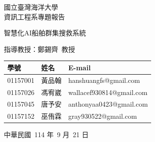 \documentclass[12pt,a4paper]{article}
\begin{document}
\begin{titlepage}

	\centering
	\vspace*{2cm}
	
	{\Large 國立臺灣海洋大學\\[0.5cm]資訊工程系專題報告 \par}
	
	\vspace*{1cm}
	{\Huge 智慧化AI船舶群集搜救系統 \par}
	
	\vfill
	
	{\Large 指導教授：鄭錫齊\ 教授 \par}
	\vspace*{1cm}
	\begin{tabular}{lll}
	學號 & 姓名 & E-mail \\
	\hline
	01157001 & 黃品翰 & hanshuangfs@gmail.com \\
	01157026 & 馮宥崴 & wallacef930814@gmail.com \\
	01157045 & 唐予安 & anthonyaa0423@gmail.com \\
	01157152 & 巫侑霖 & gray930522@gmail.com
	\end{tabular}

	\vspace*{1cm}
	{\Large 中華民國\ 114 年\ 9 月\ 21 日 \par}

\end{titlepage}

\vspace*{0.3\textheight}
\begin{abstract}
本研究提出一套「智慧化AI船舶群集搜救系統」，旨在改善海上的搜救方式。傳統的搜救常常面臨海象險惡、作業風險高及搜尋範圍廣闊等挑戰，很容易錯過黃金救援時間，且存在高危險性。本研究希望透過無人船的應用，降低搜救人員傷亡風險，同時提升大範圍搜尋的效率，解決現有搜救作業的困難。
\par
為因應上述挑戰，本系統以無人船群集協作為核心，透過演算法規劃搜救路徑，並可根據海流、風向等環境因素即時調整搜尋方向。由於缺乏實體船舶作為驗證平台，本研究採用 Unity 模擬環境進行系統建構與實驗，並針對單人與多人落水情境進行測試，驗證其可行性。
\par
實驗結果顯示，本系統在單一落水搜救情境下達到 82\%  的搜尋成功率，相較於傳統人工搜尋僅約 50\%  的成功率有顯著提升；在多人落水的情況下，系統能搜尋到 78\%  的落水人員。此外，針對因風向影響的落水人員移動，本系統的預測準確率達 70\%。
\par
本研究的貢獻在於證實無人船群集應用於海上搜救的潛力，能有效降低人力風險並縮短救援時間。未來若能進一步導入真實海域測試，並結合感應器精度、通訊穩定性及實際惡劣天候下的作業考量，將更加貼近實際應用的需求，並提升系統的實用價值。

\end{abstract}
\end{document}
